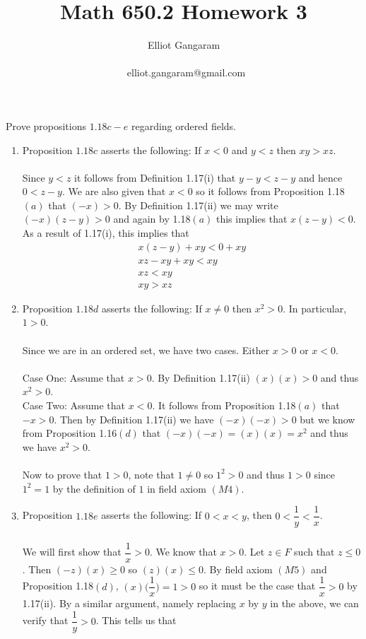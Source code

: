 \documentclass[12pt]{article}
\title{Math 650.2 Homework 3}
\author{Elliot Gangaram\\
\date{}
\ elliot.gangaram@gmail.com \\}
\begin{document}
\maketitle

\problem Prove propositions $1.18c-e$ regarding ordered fields.
\begin{enumerate}
\item Proposition $1.18c$ asserts the following: If $x<0$ and $y<z$ then $xy>xz$. \\ \\
Since $y<z$ it follows from Definition 1.17(i) that $y-y<z-y$ and hence $0<z-y$. We are also given that $x<0$ so it follows from Proposition 1.18$(a)$ that $(-x)>0$. By Definition 1.17(ii) we may write $(-x)(z-y)>0$ and again by 1.18$(a)$ this implies that $x(z-y)<0$. As a result of  1.17(i), this implies that \begin{gather*} 
x(z-y)+ xy < 0+ xy \\
xz-xy+xy<xy \\ 
xz<xy \\
xy>xz
\end{gather*} 
\item Proposition $1.18d$ asserts the following: If $x \neq 0$ then $x^{2}>0$. In particular, $1>0$. \\ \\
Since we are in an ordered set, we have two cases. Either $x>0$ or $x<0$. \\ \\
Case One: Assume that $x>0$. By Definition 1.17(ii) $(x)(x)>0$ and thus $x^{2}>0$. \\
Case Two: Assume that $x<0$. It follows from Proposition 1.18$(a)$ that $-x>0$. Then by Definition 1.17(ii) we have $(-x)(-x)>0$ but we know from Proposition 1.16$(d)$ that $(-x)(-x)=(x)(x)=x^{2}$ and thus we have $x^{2}>0$.\\ \\
Now to prove that $1>0$, note that $1 \neq 0$ so $1^{2}>0$ and thus $1>0$ since $1^{2}=1$ by the definition of $1$ in field axiom $(M4)$.\\
\item Proposition $1.18e$ asserts the following: If $0<x<y$, then $0<\dfrac{1}{y}<\dfrac{1}{x}$. \\ \\
We will first show that $\dfrac{1}{x}>0$. We know that $x>0$. Let $z \in F$ such that $z \leq 0$. Then $(-z)(x) \geq 0$ so $(z)(x) \leq 0$. By field axiom $(M5)$ and Proposition 1.18$(d)$, $(x) \bigg(\dfrac{1}{x} \bigg) = 1 > 0$ so it must be the case that $\dfrac{1}{x} >0$ by 1.17(ii). By a similar argument, namely replacing $x$ by $y$ in the above, we can verify that $\dfrac{1}{y}>0$. This tells us that \begin{equation}

\end{equation}
\end{enumerate}
\end{document}
